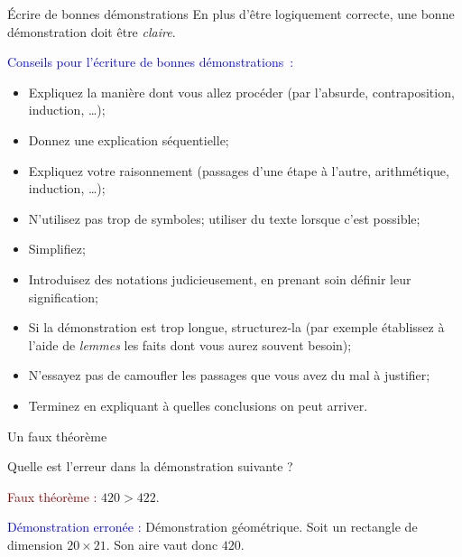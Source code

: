 \begin{frame}{Écrire de bonnes démonstrations}
En plus d'être logiquement correcte, une bonne démonstration doit être
{\em claire}.   

\bigskip

\textcolor{blue}{Conseils pour l'écriture de bonnes démonstrations~:}

\begin{itemize}
\item Expliquez la manière dont vous allez procéder (par l'absurde, contraposition, induction,
\ldots);
\item Donnez une explication séquentielle;
\item Expliquez votre raisonnement (passages d'une étape à l'autre,
arithmétique, induction, \ldots);
\item N'utilisez pas trop de symboles; utiliser du texte lorsque c'est possible;
\item Simplifiez;
\end{itemize}
\end{frame}

\begin{frame}
\begin{itemize}
\item Introduisez des notations judicieusement, en prenant soin 
définir leur signification;
\item Si la démonstration est trop longue, structurez-la (par exemple
établissez à l'aide de {\em lemmes} les faits dont vous aurez souvent besoin);
\item N'essayez pas de camoufler les passages que vous avez du mal à 
justifier;
\item Terminez en expliquant à quelles conclusions on peut arriver.
\end{itemize}
\end{frame}

\begin{frame}{Un faux théorème}

Quelle est l'erreur dans la démonstration suivante ?

\bigskip

\textcolor{darkred}{Faux théorème :} $420 > 422$.

\bigskip

\textcolor{blue}{Démonstration erronée :}
Démonstration géométrique.  Soit un rectangle de dimension $20 \times 21$.
Son aire vaut donc $420$.

\begin{center}

\end{center}
\end{frame}

